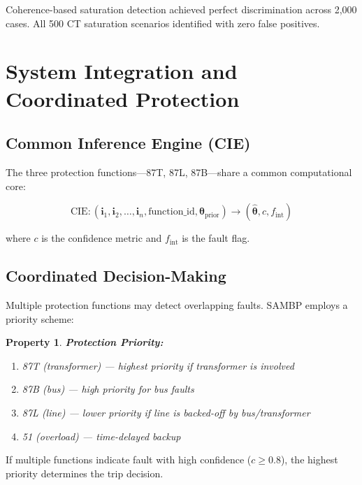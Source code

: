 \documentclass[12pt,a4paper]{article}
\newtheorem{property}[theorem]{Property}
\newcommand{\hattheta}{\hat{\boldsymbol{\theta}}}
\begin{document}
Coherence-based saturation detection achieved perfect discrimination across 2,000 cases. All 500 CT saturation scenarios identified with zero false positives.

\section{System Integration and Coordinated Protection}
\label{sec:integration}

\subsection{Common Inference Engine (CIE)}
\label{subsec:cie}

The three protection functions—87T, 87L, 87B—share a common computational core:

\begin{equation}
\text{CIE}: (\mathbf{i}_1, \mathbf{i}_2, \ldots, \mathbf{i}_n, \text{function\_id}, \mathbf{\theta}_{\text{prior}}) \to (\hattheta, c, f_{\text{int}})
\label{eq:cie}
\end{equation}

where $c$ is the confidence metric and $f_{\text{int}}$ is the fault flag.

\subsection{Coordinated Decision-Making}
\label{subsec:coordination}

Multiple protection functions may detect overlapping faults. SAMBP employs a priority 
scheme:

\begin{property}
\label{prop:priority}
\textbf{Protection Priority:}
\begin{enumerate}
    \item 87T (transformer) — highest priority if transformer is involved
    \item 87B (bus) — high priority for bus faults
    \item 87L (line) — lower priority if line is backed-off by bus/transformer
    \item 51 (overload) — time-delayed backup
\end{enumerate}
\end{property}

If multiple functions indicate fault with high confidence ($c \geq 0.8$), the highest 
priority determines the trip decision.
\end{document}
